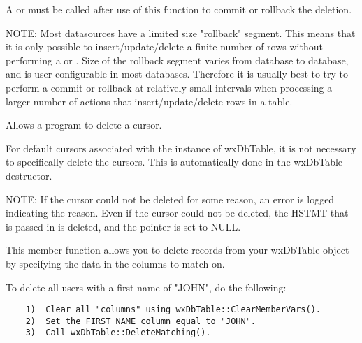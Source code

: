 A  or 
 must be called after use of 
this function to commit or rollback the deletion.

NOTE: Most datasources have a limited size "rollback" segment.  This means 
that it is only possible to insert/update/delete a finite number of rows 
without performing a  or 
.  Size of the rollback 
segment varies from database to database, and is user configurable in 
most databases.  Therefore it is usually best to try to perform a commit 
or rollback at relatively small intervals when processing a larger number 
of actions that insert/update/delete rows in a table.


\label{wxdbtabledeletecursor}


Allows a program to delete a cursor.




For default cursors associated with the instance of wxDbTable, it is not 
necessary to specifically delete the cursors.  This is automatically done 
in the wxDbTable destructor.

NOTE: If the cursor could not be deleted for some reason, an error is logged 
indicating the reason.  Even if the cursor could not be deleted, the HSTMT 
that is passed in is deleted, and the pointer is set to NULL.



\label{wxdbtabledeletematching}


This member function allows you to delete records from your wxDbTable object 
by specifying the data in the columns to match on.  


To delete all users with a first name of "JOHN", do the following:

\begin{verbatim}
    1)  Clear all "columns" using wxDbTable::ClearMemberVars().
    2)  Set the FIRST_NAME column equal to "JOHN".
    3)  Call wxDbTable::DeleteMatching().
\end{verbatim}


